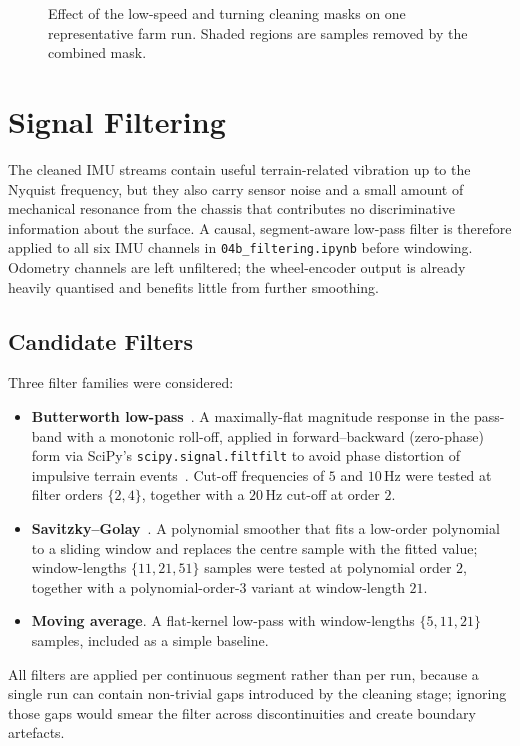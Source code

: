 \begin{figure}[H]
    \centering
    \caption{Effect of the low-speed and turning cleaning masks on one
    representative farm run. Shaded regions are samples removed by the
    combined mask.}
    \label{fig:cleaning_demo}
\end{figure}

\section{Signal Filtering}
\label{sec:filtering}

The cleaned IMU streams contain useful terrain-related vibration up to the Nyquist frequency, but they also carry sensor noise and a small amount of mechanical resonance from the chassis that contributes no discriminative information about the surface. A causal, segment-aware low-pass filter is therefore applied to all six IMU channels in \texttt{04b\_filterin\allowbreak g.ipynb} before windowing. Odometry channels are left unfiltered; the wheel-encoder output is already heavily quantised and benefits little from further smoothing.

\subsection{Candidate Filters}

Three filter families were considered:
\begin{itemize}
    \item \textbf{Butterworth low-pass}~\cite{Butterworth1930}. A maximally-flat magnitude response in the pass-band with a monotonic roll-off, applied in forward--backward (zero-phase) form via SciPy's \texttt{scipy.signal.\allowbreak filtfilt} to avoid phase distortion of impulsive terrain events~\cite{Gustafsson1996}. Cut-off frequencies of $5$ and $10\,\text{Hz}$ were tested at filter orders $\{2, 4\}$, together with a $20\,\text{Hz}$ cut-off at order $2$.
    \item \textbf{Savitzky--Golay}~\cite{Savitzky1964}. A polynomial smoother that fits a low-order polynomial to a sliding window and replaces the centre sample with the fitted value; window-lengths $\{11, 21, 51\}$ samples were tested at polynomial order $2$, together with a polynomial-order-$3$ variant at window-length $21$.
    \item \textbf{Moving average}. A flat-kernel low-pass with window-lengths $\{5, 11, 21\}$ samples, included as a simple baseline.
\end{itemize}
All filters are applied per continuous segment rather than per run, because a single run can contain non-trivial gaps introduced by the cleaning stage; ignoring those gaps would smear the filter across discontinuities and create boundary artefacts.

